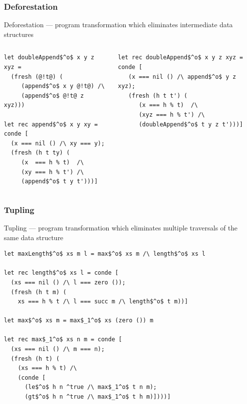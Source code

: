 \documentclass[xcolor=table]{beamer}
\begin{document}
\begin{frame}[fragile]
  \transwipe[direction=90]
  \frametitle{Deforestation}
Deforestation --- program transformation which eliminates intermediate data structures

\begin{columns}
\begin{column}{0.45\textwidth}
\begin{lstlisting}[basicstyle=\footnotesize]
let doubleAppend$^o$ x y z xyz = 
  (fresh (@!t@) (
     (append$^o$ x y @!t@) /\
     (append$^o$ @!t@ z xyz)))

let rec append$^o$ x y xy = conde [
  (x === nil () /\ xy === y);
  (fresh (h t ty) (
     (x  === h % t)  /\  
     (xy === h % t') /\
     (append$^o$ t y t')))]
\end{lstlisting}
\end{column}
\begin{column}{0.55\textwidth}  
\begin{lstlisting}[basicstyle=\footnotesize]
let rec doubleAppend$^o$ x y z xyz = conde [
   (x === nil () /\ append$^o$ y z xyz);
   (fresh (h t t') (
      (x === h % t)  /\  
      (xyz === h % t') /\
      (doubleAppend$^o$ t y z t')))]
\end{lstlisting}
\end{column}
\end{columns}
\end{frame}

\begin{frame}[fragile]
  \transwipe[direction=90]
  \frametitle{Tupling}
Tupling --- program transformation which eliminates multiple traversals of the same data structure

\begin{lstlisting}[basicstyle=\footnotesize]
let maxLength$^o$ xs m l = max$^o$ xs m /\ length$^o$ xs l

let rec length$^o$ xs l = conde [
  (xs === nil () /\ l === zero ());
  (fresh (h t m) (
    xs === h % t /\ l === succ m /\ length$^o$ t m))]

let max$^o$ xs m = max$_1^o$ xs (zero ()) m

let rec max$_1^o$ xs n m = conde [
  (xs === nil () /\ m === n);
  (fresh (h t) (
    (xs === h % t) /\
    (conde [
      (le$^o$ h n ^true /\ max$_1^o$ t n m); 
      (gt$^o$ h n ^true /\ max$_1^o$ t h m)])))]
\end{lstlisting}

\end{frame}
\end{document}

